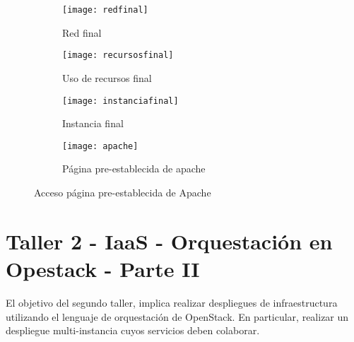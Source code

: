 \documentclass[10pt]{article}   			%
\begin{document}
\begin{itemize}
\begin{figure}[ht]
\centering
\begin{subfigure}[b]{0.4\textwidth}  		%
	\texttt{[image: redfinal]}
	\caption{Red final}
	\label{fig:redfinal}
\end{subfigure}
\begin{subfigure}[b]{0.4\textwidth}		 	%
	\texttt{[image: recursosfinal]}
	\caption{Uso de recursos final}
	\label{fig:recursosfinal}
\end{subfigure}
\begin{subfigure}[b]{0.8\textwidth}		 	%
	\texttt{[image: instanciafinal]}
	\caption{Instancia final}
	\label{fig:instanciafinal}
\end{subfigure}
\begin{subfigure}[b]{0.8\textwidth}		 	%
	\texttt{[image: apache]}
	\caption{Página pre-establecida de apache}
	\label{fig:apache}
\end{subfigure}

\caption{Acceso página pre-establecida de Apache}\label{fig:Apache}

\end{figure}

\end{itemize}

\newpage %

\section{Taller 2 - IaaS - Orquestación en Opestack - Parte II}

El objetivo del segundo taller, implica realizar despliegues de infraestructura utilizando el lenguaje de orquestación de OpenStack. En particular, realizar un despliegue multi-instancia cuyos servicios deben colaborar.
		
\end{document}
